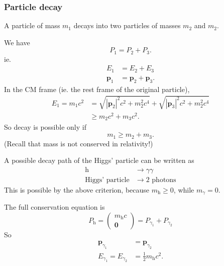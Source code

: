 \documentclass[a4paper]{article}
\begin{document}
\subsubsection*{Particle decay}
A particle of mass $m_1$ decays into two particles of masses $m_2$ and $m_2$.

We have
\[
  P_1 = P_2 + P_3.
\]
ie.
\begin{align*}
  E_1 &= E_2 + E_3\\
  \mathbf{p}_1 &= \mathbf{p}_2 + \mathbf{p}_3.
\end{align*}
In the CM frame (ie. the rest frame of the original particle),
\begin{align*}
  E_1 = m_1 c^2 &= \sqrt{|\mathbf{p}_2|^2 c^2 + m_2^2c^4} + \sqrt{|\mathbf{p}_3|^2 c^2 + m_2^2 c^4}\\
  &\geq m_2c^2 + m_3 c^2.
\end{align*}
So decay is possible only if
\[
  m_1 \geq m_2 + m_3.
\]
(Recall that mass is not conserved in relativity!)

\begin{eg}
  A possible decay path of the Higgs' particle can be written as
  \begin{align*}
    \mathrm{h} &\to \gamma \gamma\\
    \text{Higgs'\ particle} &\to 2\text{ photons}
  \end{align*}
  This is possible by the above criterion, because $m_\mathrm{h} \geq 0$, while $m_\gamma = 0$.

  The full conservation equation is
  \[
    P_\mathrm{h} =
    \begin{pmatrix}
      m_\mathrm{h}c\\
      \mathbf{0}
    \end{pmatrix} =
    P_{\gamma_1} + P_{\gamma_2}
  \]
  So
  \begin{align*}
    \mathbf{p}_{\gamma_1} &= \mathbf{p}_{\gamma_2}\\
    E_{\gamma_1} = E_{\gamma_2} &= \frac{1}{2}m_\mathrm{h} c^2.
  \end{align*}
\end{eg}
\end{document}
